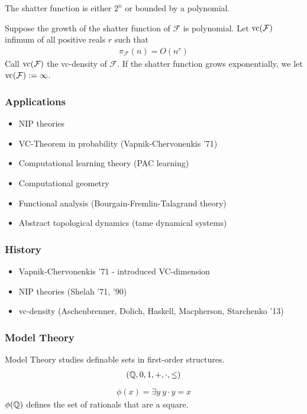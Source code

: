 \documentclass{beamer}
\newcommand{\F}{\mathcal F}
\begin{document}
\begin{frame}
	\begin{Theorem} 
		The shatter function is either $2^n$ or bounded by a polynomial.
	\end{Theorem}
	\begin{Definition}
		Suppose the growth of the shatter function of $\F$ is polynomial.
		Let $\vc(\F)$ infimum of all positive reals $r$ such that
		\begin{align*}
			\pi_\F(n) = O(n^r)
		\end{align*}
		Call $\vc(\F)$ the vc-density of $\F$.
		If the shatter function grows exponentially, we let $\vc(\F) := \infty$.
	\end{Definition}
\end{frame}

\begin{frame}
	\frametitle{Applications}
	\begin{itemize}
		\item NIP theories
		\item VC-Theorem in probability (Vapnik-Chervonenkis '71)
		\item Computational learning theory (PAC learning)
		\item Computational geometry
		\item Functional analysis (Bourgain-Fremlin-Talagrand theory)
		\item Abstract topological dynamics (tame dynamical systems)
	\end{itemize}
\end{frame}

\begin{frame}
	\frametitle{History}
	\begin{itemize}
		\item Vapnik-Chervonenkis '71 - introduced VC-dimension
		\item NIP theories (Shelah '71, '90)
		\item vc-density (Aschenbrenner, Dolich, Haskell, Macpherson, Starchenko '13)
	\end{itemize}
\end{frame}

\begin{frame}
	\frametitle{Model Theory}
	Model Theory studies definable sets in first-order structures.
	\begin{align*}
		(\mathbb{Q}, 0, 1, +, \cdot, \leq)
	\end{align*}
	\begin{align*}
		\phi(x) = \exists y \ y \cdot y = x
	\end{align*}
	$\phi(\mathbb{Q})$ defines the set of rationals that are a square.
\end{frame}
\end{document}

